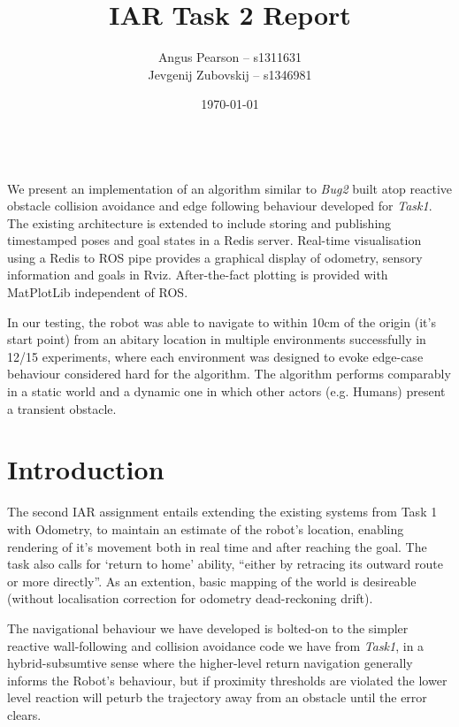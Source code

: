 \documentclass[11pt, a4paper]{article}
\renewenvironment{abstract}{%
{\mdseries\scshape\Large\abstractname}
\vspace{1em}\\
}{\par\noindent}
\begin{document}
\title{IAR Task 2 Report}
\author{Angus Pearson -- s1311631\\ Jevgenij Zubovskij -- s1346981}
\date{\today}
\maketitle



\begin{abstract}
  We present an implementation of an algorithm similar to \textit{Bug2} \cite{principlesrobot} 
  built atop reactive obstacle collision avoidance and edge following behaviour developed for 
  \textit{Task1}. The existing architecture is extended to include storing and publishing 
  timestamped poses and goal states in a Redis \cite{Redis} server.
  Real-time visualisation using a Redis to ROS \cite{ROS} pipe provides a graphical display 
  of odometry, sensory information and goals in Rviz. After-the-fact plotting is provided 
  with MatPlotLib independent of ROS.

  In our testing, the robot was able to navigate to within 10cm of the origin (it's start point) 
  from an abitary location in multiple environments successfully in 12/15 experiments, where each 
  environment was designed to evoke edge-case behaviour considered hard for the algorithm. The 
  algorithm performs comparably in a static world and a dynamic one in which other actors 
  (e.g. Humans) present a transient obstacle. 
\end{abstract}



\section{Introduction}
\label{Introduction}

The second IAR assignment entails extending the existing systems from Task 1 with Odometry, 
to maintain an estimate of the robot's location, enabling rendering of it's movement both 
in real time and after reaching the goal. The task also calls for `return to home' ability, 
``either by retracing its outward route or more directly''. As an extention, basic mapping 
of the world is desireable (without localisation correction for odometry dead-reckoning drift). 

The navigational behaviour we have developed is bolted-on to the simpler reactive wall-following
and collision avoidance code we have from \textit{Task1}, in a hybrid-subsumtive sense where the
higher-level return navigation generally informs the Robot's behaviour, but if proximity thresholds
are violated the lower level reaction will peturb the trajectory away from an obstacle until the
error clears.
\end{document}
